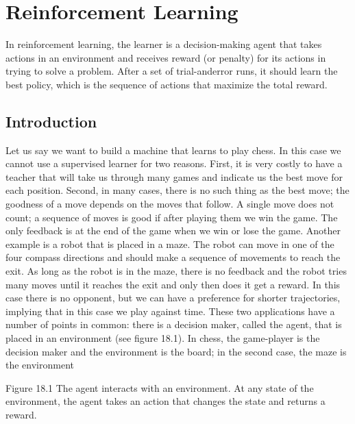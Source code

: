 \chapter{Reinforcement Learning}
\label{chap:18-reinforcement-learning}

In reinforcement learning, the learner is a decision-making agent that takes actions in an environment and receives reward (or penalty) for its actions in trying to solve a problem. After a set of trial-anderror runs, it should learn the best policy, which is the sequence of actions that maximize the total reward.

\section{Introduction}

Let us say we want to build a machine that learns to play chess. In this case we cannot use a supervised learner for two reasons. First, it is very costly to have a teacher that will take us through many games and indicate us the best move for each position. Second, in many cases, there is no such thing as the best move; the goodness of a move depends on the moves that follow. A single move does not count; a sequence of moves is good if after playing them we win the game. The only feedback is at the end of the game when we win or lose the game. Another example is a robot that is placed in a maze. The robot can move in one of the four compass directions and should make a sequence of movements to reach the exit. As long as the robot is in the maze, there is no feedback and the robot tries many moves until it reaches the exit and only then does it get a reward. In this case there is no opponent, but we can have a preference for shorter trajectories, implying that in this case we play against time. These two applications have a number of points in common: there is a decision maker, called the agent, that is placed in an environment (see figure 18.1). In chess, the game-player is the decision maker and the environment is the board; in the second case, the maze is the environment

Figure 18.1 The agent interacts with an environment. At any state of the environment, the agent takes an action that changes the state and returns a reward.

